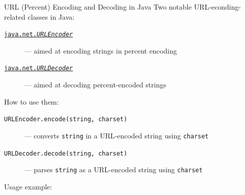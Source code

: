 \documentclass[presentation]{beamer}\mode<presentation>{\usetheme{AMSBolognaFC}}
\begin{document}
\begin{frame}[allowframebreaks]
    \begin{block}{URL (Percent) Encoding and Decoding in Java}
        Two notable URL-econding-related classes in Java:
        \begin{description}
            \item[\href{\javadoc{java/net/URLEncoder.html}}{\texttt{java.net.\textit{URLEncoder}}}] --- aimed at encoding strings in percent encoding
            \item[\href{\javadoc{java/net/URLDecoder.html}}{\texttt{java.net.\textit{URLDecoder}}}] --- aimed at decoding percent-encoded strings
        \end{description}

        \medskip

        How to use them:
        \begin{description}
            \item[\texttt{URLEncoder.encode(string, charset)}] --- converts \texttt{string} in a URL-encoded string using \texttt{charset}
            \item[\texttt{URLDecoder.decode(string, charset)}] --- parses \texttt{string} as a URL-encoded string using \texttt{charset}
        \end{description}
    \end{block}

    \framebreak

    Usage example:
    
\end{frame}
\end{document}
